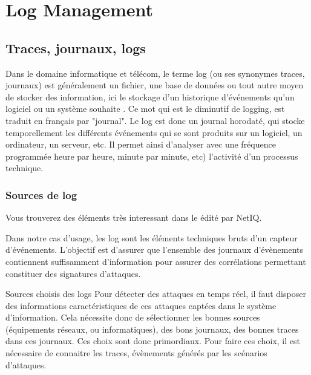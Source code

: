 
\section{Log Management }

\subsection{Traces, journaux, logs}

Dans le domaine informatique et télécom, le terme log (ou ses synonymes traces, journaux) est généralement un fichier, une base de données ou tout autre moyen de stocker des information, ici le stockage d'un historique d'événements qu'un logiciel ou un système souhaite . 
Ce mot qui est le diminutif  de logging, est traduit en français par "journal". Le log est donc un journal horodaté, qui stocke temporellement les différents événements qui se sont produits sur un  logiciel, un ordinateur, un serveur, etc. Il permet ainsi d'analyser avec une fréquence programmée heure par heure,  minute par minute, etc) l'activité  d'un processus technique.  

\begin{frame}
\frametitle<presentation>{Sources de log}
\end{frame}

Vous trouverez des éléments très interessant  dans le 
 édité par NetIQ.

Dans notre cas d'usage, les log sont les éléments techniques  bruts d'un capteur d'événements. L'objectif est d'assurer que l'ensemble des journaux d'évènements contiennent suffisamment d'information pour assurer des corrélations permettant  constituer des signatures d'attaques. 

\begin{notebox}{Sources choisis des logs }
Pour détecter des attaques en temps réel, il faut disposer des informations caractéristiques de ces attaques captées dans le système d'information. Cela nécessite  donc de sélectionner les bonnes sources (équipements réseaux, ou informatiques), des bons journaux, des bonnes traces dans ces journaux.  Ces choix sont donc primordiaux. Pour faire ces choix, il est nécessaire de connaitre les traces, évènements générés par les scénarios d'attaques.
\end{notebox} 

